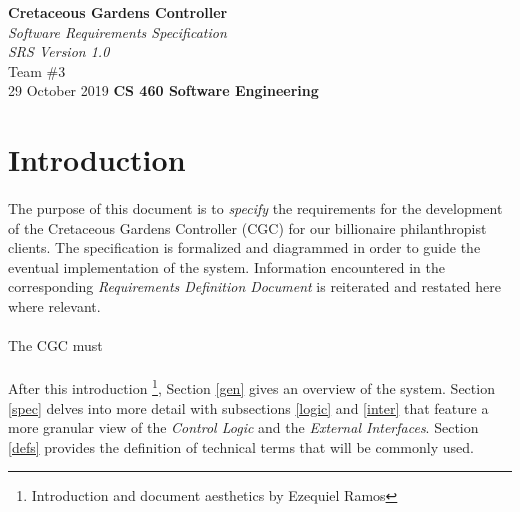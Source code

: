 \documentclass[12pt]{article}
\begin{document}
\begin{titlepage}
	\begin{flushleft}
		\vspace{1cm} \Huge  \textbf{Cretaceous Gardens Controller}\\
		\vspace{1cm} \Huge  \textit{Software Requirements Specification}\\
		\vspace{1cm} \Large \textit{SRS Version 1.0}\\
		\vspace{5cm} \LARGE         Team \#3\\ 
		                            29 October 2019
		\vfill       \Huge  \textbf{CS 460 Software Engineering}
	\end{flushleft}
\end{titlepage}
\normalsize \tableofcontents
\pagebreak

\section{Introduction} \label{intro} %
	\paragraph{} The purpose of this document is to \textit{specify} the requirements for the
	 development of the Cretaceous Gardens Controller (CGC) for our billionaire philanthropist clients. 
	 The specification is formalized and diagrammed in order to guide the eventual
	 implementation of the system. Information encountered in the corresponding \textit{Requirements 
	 Definition Document} is reiterated and restated here where relevant.
	 
	 \paragraph{} The CGC must 
	 
	 \paragraph{} After this introduction \footnote{Introduction and document aesthetics by Ezequiel Ramos}, 
	 Section \ref{gen} gives an overview of the system. Section \ref{spec} delves into more 
	 detail with subsections \ref{logic} and \ref{inter} that feature a more granular view 
	 of the \textit{Control Logic} and the \textit{External Interfaces}. Section \ref{defs} 
	 provides the definition of technical terms that will be commonly used.
\pagebreak
\end{document}
